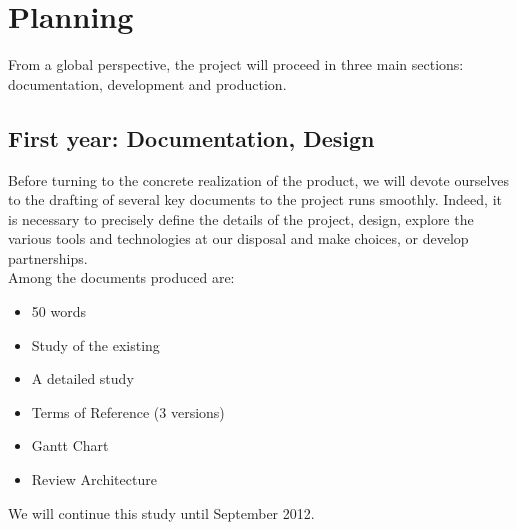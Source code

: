 \documentclass {life-en}
\begin{document}
\section{Planning}

From a global perspective, the project will proceed in three main sections: documentation, development and production.\\

\subsection{First year: Documentation, Design}

Before turning to the concrete realization of the product, we will devote ourselves to the drafting of several key documents to the project runs smoothly. Indeed, it is necessary to precisely define the details of the project, design, explore the various tools and technologies at our disposal and make choices, or develop partnerships.\\
Among the documents produced are:

\begin{itemize}
  \item 50 words
  \item Study of the existing
  \item A detailed study
  \item Terms of Reference (3 versions)
  \item Gantt Chart
  \item Review Architecture
\end{itemize}

We will continue this study until September 2012.\\

\newpage
\end{document}
